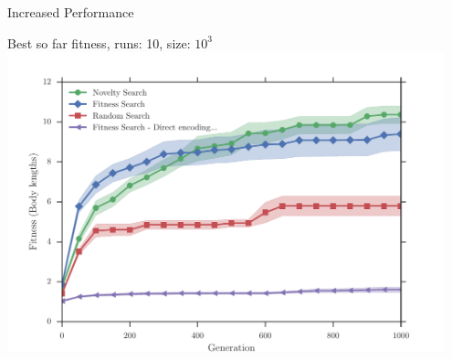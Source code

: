 \documentclass[6pt]{beamer}
\begin{document}
{\begin{frame}{Increased Performance}
\begin{block}{Best so far fitness, runs: 10, size: $10^3$}
\centering
\includegraphics[width=0.95\textwidth]{../Figures/Results/FitvsNovVsDirSize10.pdf}
\end{block}
\end{frame}

}
\end{document}
